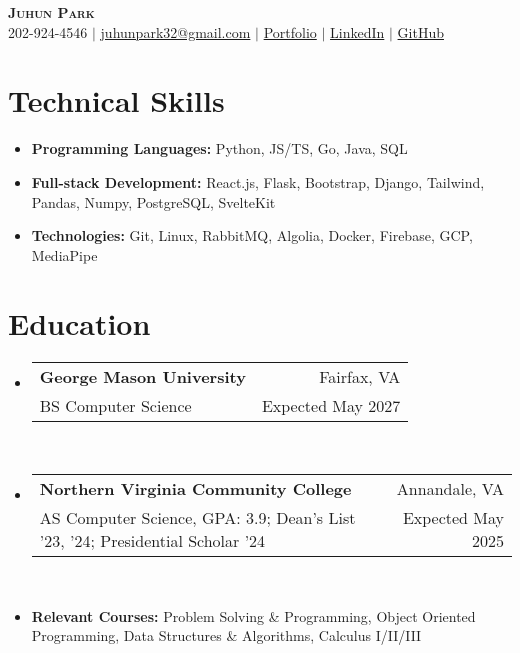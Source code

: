 \documentclass[letterpaper,11pt]{article}
\makeatletter
\newcommand{\resumeItem}[1]{
  \item\small{
    {#1 \vspace{3pt}}
  }
}
\newcommand{\resumeItemThin}[1]{
  \item\small{
    {#1 \vspace{-5pt}}
  }
}
\newcommand{\resumeSubheading}[4]{
    \item
    \begin{tabular*}{0.985\textwidth}[t]{l@{\extracolsep{\fill}}r@{\hspace{-0.1in}}}
        \small{\textbf{#1}} & \small{#2} \\
        \small#3 & \small #4 \\
    \end{tabular*}\vspace{-3pt}
}
\newcommand{\resumeSubHeadingListStart}{\begin{itemize}[leftmargin=0.00in, rightmargin=-0.2in, label={}]\vspace{1pt}}
\newcommand{\resumeSubHeadingListEnd}{\end{itemize}\vspace{-10pt}}
\newcommand{\resumeItemListStart}{\begin{itemize}[leftmargin=0.15in, rightmargin=0.15in]}
\newcommand{\resumeItemListEnd}{\end{itemize}\vspace{-10pt}}
\makeatother
\begin{document}

\begin{center}
  \textbf{\Huge \scshape {Juhun Park}} \\ \vspace{1pt}
  \small 202-924-4546 $|$
  \href{mailto:juhunpark32@gmail.com}{juhunpark32@gmail.com} $|$
  \href{https://juhun-park.vercel.app/}{Portfolio} $|$
  \href{https://linkedin.com/in/juhun-park}{LinkedIn} $|$
  \href{https://github.com/juhun32}{GitHub} \\
\end{center}

\vspace{-10pt}


\section{Technical Skills}
\vspace{3pt}
\resumeItemListStart
\resumeItemThin{\textbf{Programming Languages: }{Python, JS/TS, Go, Java, SQL}}\\
\resumeItemThin{\textbf{Full-stack Development: }{React.js, Flask, Bootstrap, Django, Tailwind, Pandas, Numpy, PostgreSQL, SvelteKit}}\\
\resumeItemThin{\textbf{Technologies: }{Git, Linux, RabbitMQ, Algolia, Docker, Firebase, GCP, MediaPipe}}\\
\resumeItemListEnd


\section{Education}
\resumeSubHeadingListStart
\resumeSubheading
{George Mason University}{Fairfax, VA}
{BS Computer Science}{Expected May 2027}\\

\resumeSubheading
{Northern Virginia Community College}{Annandale, VA}
{AS Computer Science, GPA: 3.9; Dean's List '23, '24; Presidential Scholar '24}{Expected May 2025} \\

\resumeItem{\textbf{Relevant Courses: }{Problem Solving \& Programming, Object Oriented Programming, Data Structures \& Algorithms, Calculus I/II/III}}
\resumeSubHeadingListEnd
\vspace{-3pt}

\end{document}
